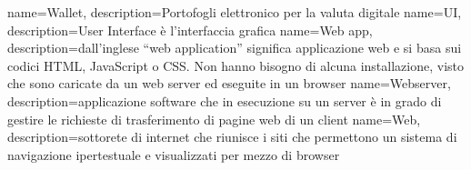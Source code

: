 { name={Wallet}, description={Portofogli elettronico per la valuta digitale} }
 { name={UI}, description={User Interface è l'interfaccia grafica} }
 { name={Web app}, description={dall'inglese “web application” significa applicazione web e si basa sui codici HTML, JavaScript o CSS. Non hanno bisogno di alcuna installazione, visto che sono caricate da un web server ed eseguite in un browser} }
 { name={Webserver}, description={applicazione software che in esecuzione su un server è in grado di gestire le richieste di trasferimento di pagine web di un client} }
 { name={Web}, description={sottorete di internet che riunisce i siti che permettono un sistema di navigazione ipertestuale e visualizzati per mezzo di browser} }

